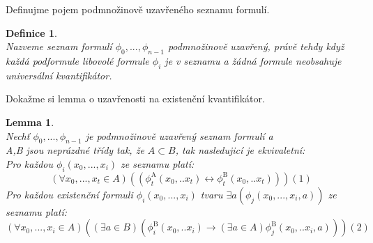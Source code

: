 \documentclass[12pt,a4paper]{article}
\newtheorem{lemma}[veta]{Lemma}
\newtheorem{definice}[veta]{Definice}
\begin{document}
Definujme pojem podmno\v{z}inov\v{e} uzav\v{r}en\'{e}ho seznamu formul\'{i}.
\begin{definice}
~\\
Nazveme seznam formul\'{i} $ \phi_0,...,\phi_{n-1}  $ podmno\v{z}inov\v{e} uzav\v{r}en\'{y}, pr\'{a}v\v{e} tehdy kdy\v{z} ka\v{z}d\'{a} podformule libovol\'{e} formule $ \phi_i $ je v seznamu a \v{z}\'{a}dn\'{a} formule neobsahuje univers\'{a}ln\'{i} kvantifik\'{a}tor. 
\end{definice}
Doka\v{z}me si lemma o uzav\v{r}enosti na existen\v{c}n\'{i} kvantifik\'{a}tor.
\begin{lemma}
\label{lem:ref}
~\\
Nech\v{t} $ \phi_0,...,\phi_{n-1}  $ je podmno\v{z}inov\v{e} uzav\v{r}en\'{y}  seznam formul\'{i} a \\ A,B jsou nepr\'{a}zdn\'{e} t\v{r}\'{i}dy tak, \v{z}e $ A \subset B $, tak nasledujic\'{i} je ekvivaletn\'{i}:\\
Pro ka\v{z}dou $ \phi_{i}(x_0,...,x_i) $ ze seznamu plat\'{i}:
\[ (\forall x_0,...,x_t \in A) ((\phi_{t}^\mathrm{A}(x_0,..x_t) \leftrightarrow  \phi_{t}^\mathrm{B}(x_0,..x_t) ))(1) \] 
Pro ka\v{z}dou existen\v{c}n\'{i} formuli $ \phi_{i}(x_0,...,x_i) $ tvaru $ \exists a (\phi_{j}(x_0,...,x_i,a)) $ ze seznamu plat\'{i}:
\[ (\forall x_0,...,x_i \in A) ((\exists a \in B) (\phi_{i}^\mathrm{B}(x_0,..x_i) \rightarrow (\exists a \in A) \phi_{j}^\mathrm{B}(x_0,..x_i,a) )) (2) \]
\end{lemma}
\end{document}
